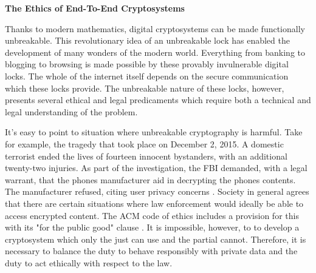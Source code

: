 \documentclass{article}
\begin{document}
  \begin{center}
    \large\textbf{The Ethics of End-To-End Cryptosystems}
  \end{center}
  
  Thanks to modern mathematics, digital cryptosystems can be made functionally
  unbreakable.  This revolutionary idea of an unbreakable lock has enabled the
  development of many wonders of the modern world.  Everything from banking to
  blogging to browsing is made possible by these provably invulnerable digital
  locks.  The whole of the internet itself depends on the secure communication
  which these locks provide.  The unbreakable nature of these locks, however,
  presents several ethical and legal predicaments which require both a 
  technical and legal understanding of the problem.

  It's easy to point to situation where unbreakable cryptography is harmful.
  Take for example, the tragedy that took place on December 2, 2015.  A
  domestic terrorist ended the lives of fourteen innocent bystanders, with an
  additional twenty-two injuries.  As part of the investigation, the FBI
  demanded, with a legal warrant, that the phones manufacturer aid in 
  decrypting the phones contents.  The manufacturer refused, citing user
  privacy concerns \cite{Feinstein}.  Society in general agrees that there are
  certain situations where law enforcement would ideally be able to access
  encrypted content.  The ACM code of ethics includes a provision for this with
  its "for the public good" clause \cite{ACM}.  It is impossible, however, to
  to develop a cryptosystem which only the just can use and the partial cannot.
  Therefore, it is necessary to balance the duty to behave responsibly with
  private data and the duty to act ethically with respect to the law.
\end{document}
